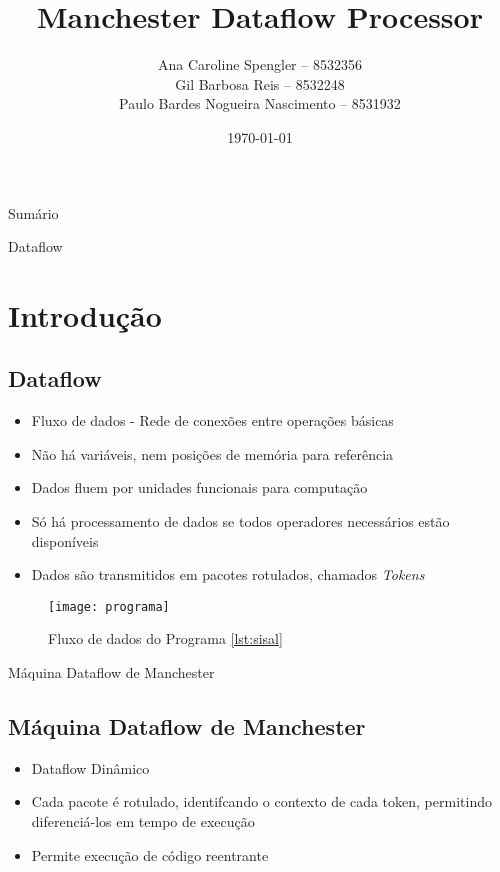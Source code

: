 \documentclass{beamer}
\title{Manchester Dataflow Processor}
\author[Ana C. Spengler, Gil B. Reis, Paulo B. N. Nascimento]
		{Ana Caroline Spengler -- 8532356 \\
        Gil Barbosa Reis -- 8532248 \\
        Paulo Bardes Nogueira Nascimento -- 8531932}
\institute{ICMC - USP São Carlos}
\date{\today}
\begin{document}
\begin{frame}
	\titlepage
\end{frame}

\begin{frame}{Sumário}
	\tableofcontents
\end{frame}

\begin{frame}{Dataflow}
	\section{Introdução}
	\subsection{Dataflow}
	
	\begin{itemize}
		\item Fluxo de dados - Rede de conexões entre operações básicas
		\item Não há variáveis, nem posições de memória para referência
		\item Dados fluem por unidades funcionais para computação
		\item Só há processamento de dados se todos operadores necessários estão disponíveis
		\item Dados são transmitidos em pacotes rotulados, chamados {\em Tokens}
	\end{itemize}
\end{frame}

\begin{frame}
	\begin{figure}
		\centering
		\caption{Fluxo de dados do Programa \ref{lst:sisal}}
		\label{fig:dataflow}
		\texttt{[image: programa]}
	\end{figure}
\end{frame}

\begin{frame}{Máquina Dataflow de Manchester}
	\subsection{Máquina Dataflow de Manchester}
	\begin{itemize}
		\item Dataflow Dinâmico
		\item Cada pacote é rotulado, identifcando o contexto de cada token, permitindo diferenciá-los em tempo de execução
		\item Permite execução de código reentrante
	\end{itemize}
\end{frame}
\end{document}
